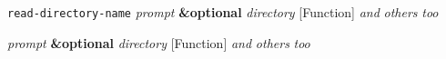 \documentclass[12pt,onecolumn]{article}
\begin{document}
\blindtext

\noindent
  \texttt{read-directory-name} \emph{prompt} \textbf {\&optional} \emph{directory}
  \hfill [Function]
\hspace*{19ex} \emph{and} \emph{others} \emph{too}
\begin{doc-string}
\blindtext

\blindtext
\end{doc-string}


\noindent
{}
  \usebox{\funcname}\emph{prompt} \textbf {\&optional} \emph{directory}
  \hfill [Function]
\hspace*{\wd\funcname} \emph{and} \emph{others} \emph{too}
\begin{doc-string}
\blindtext
\end{doc-string}

\blindtext

\printindex
\end{document}
